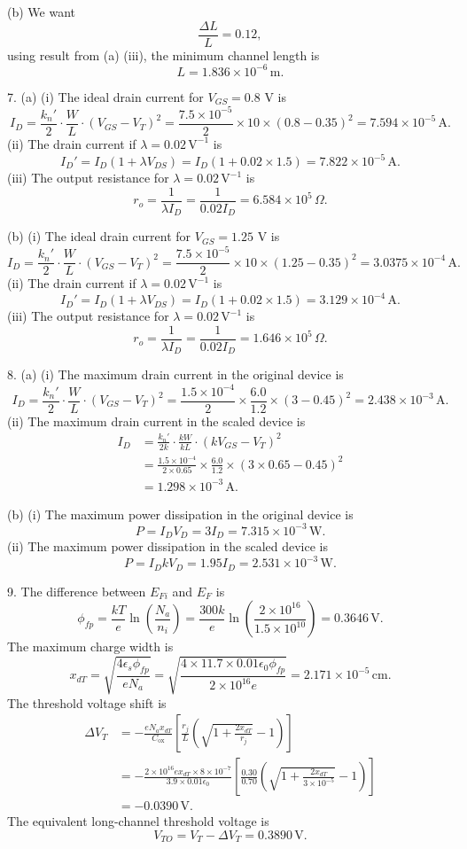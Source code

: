 \documentclass[a4paper]{article}
\begin{document}
(b) We want
\[\frac{\Delta L}{L}=0.12,\]
using result from (a) (iii), the minimum channel length is
\[L=1.836\times10^{-6}\,\text{m}.\]

7. (a) (i) The ideal drain current for $V_{GS}=0.8$ V is
\[I_D=\frac{k_n'}{2}\cdot\frac{W}{L}\cdot\left(V_{GS}-V_T\right)^2=\frac{7.5\times10^{-5}}{2}\times10\times\left(0.8-0.35\right)^2=7.594\times10^{-5}\,\text{A}.\]
(ii) The drain current if $\lambda=0.02\,\mathrm{V^{-1}}$ is
\[I_D'=I_D(1+\lambda V_{DS})=I_D(1+0.02\times1.5)=7.822\times10^{-5}\,\text{A}.\]
(iii) The output resistance for $\lambda=0.02\,\mathrm{V^{-1}}$ is
\[r_o=\frac{1}{\lambda I_D}=\frac{1}{0.02I_D}=6.584\times10^5\,\Omega.\]

(b) (i) The ideal drain current for $V_{GS}=1.25$ V is
\[I_D=\frac{k_n'}{2}\cdot\frac{W}{L}\cdot\left(V_{GS}-V_T\right)^2=\frac{7.5\times10^{-5}}{2}\times10\times\left(1.25-0.35\right)^2=3.0375\times10^{-4}\,\text{A}.\]
(ii) The drain current if $\lambda=0.02\,\mathrm{V^{-1}}$ is
\[I_D'=I_D(1+\lambda V_{DS})=I_D(1+0.02\times1.5)=3.129\times10^{-4}\,\text{A}.\]
(iii) The output resistance for $\lambda=0.02\,\mathrm{V^{-1}}$ is
\[r_o=\frac{1}{\lambda I_D}=\frac{1}{0.02I_D}=1.646\times10^5\,\Omega.\]

8. (a) (i) The maximum drain current in the original device is
\[I_D=\frac{k_n'}{2}\cdot\frac{W}{L}\cdot\left(V_{GS}-V_T\right)^2=\frac{1.5\times10^{-4}}{2}\times\frac{6.0}{1.2}\times\left(3-0.45\right)^2=2.438\times10^{-3}\,\text{A}.\]
(ii) The maximum drain current in the scaled device is
\[
    \begin{aligned}
        I_D&=\frac{k_n'}{2k}\cdot\frac{kW}{kL}\cdot\left(kV_{GS}-V_T\right)^2\\
        &=\frac{1.5\times10^{-4}}{2\times0.65}\times\frac{6.0}{1.2}\times\left(3\times0.65-0.45\right)^2\\
        &=1.298\times10^{-3}\,\text{A}.
    \end{aligned}
\]

(b) (i) The maximum power dissipation in the original device is
\[P=I_DV_D=3I_D=7.315\times10^{-3}\,\text{W}.\]
(ii) The maximum power dissipation in the scaled device is
\[P=I_DkV_D=1.95I_D=2.531\times10^{-3}\,\text{W}.\]

9. The difference between $E_{Fi}$ and $E_F$ is
\[\phi_{fp}=\frac{kT}{e}\ln{\left(\frac{N_a}{n_i}\right)}=\frac{300k}{e}\ln{\left(\frac{2\times10^{16}}{1.5\times10^{10}}\right)}=0.3646\,\text{V}.\]
The maximum charge width is
\[x_{dT}=\sqrt{\frac{4\epsilon_s\phi_{fp}}{eN_a}}=\sqrt{\frac{4\times11.7\times0.01\epsilon_0\phi_{fp}}{2\times10^{16}e}}=2.171\times10^{-5}\,\text{cm}.\]
The threshold voltage shift is
\[
    \begin{aligned}
        \Delta V_T&=-\frac{eN_ax_{dT}}{C_\text{ox}}\left[\frac{r_j}{L}\left(\sqrt{1+\frac{2x_{dT}}{r_j}}-1\right)\right]\\
        &=-\frac{2\times10^{16}ex_{dT}\times8\times10^{-7}}{3.9\times0.01\epsilon_0}\left[\frac{0.30}{0.70}\left(\sqrt{1+\frac{2x_{dT}}{3\times10^{-5}}}-1\right)\right]\\
        &=-0.0390\,\text{V}.
    \end{aligned}
\]
The equivalent long-channel threshold voltage is
\[V_{TO}=V_T-\Delta V_T=0.3890\,\text{V}.\]
\end{document}
